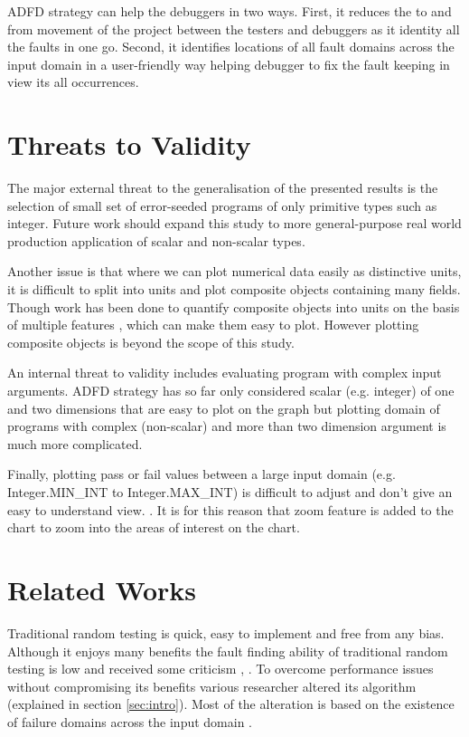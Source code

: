 \documentclass[runningheads,a4paper]{llncs}
\begin{document}
ADFD strategy can help the debuggers in two ways. First, it reduces the to and from movement of the project between the testers and debuggers as it identity all the faults in one go. Second, it identifies locations of all fault domains across the input domain in a user-friendly way helping debugger to fix the fault keeping in view its all occurrences.


\section{Threats to Validity} \label{sec:validity}
The major external threat to the generalisation of the presented results is the selection of small set of error-seeded programs of only primitive types such as integer. Future work should expand this study to more general-purpose real world production application of scalar and non-scalar types.

Another issue is that where we can plot numerical data easily as distinctive units, it is difficult to split into units and plot composite objects containing many fields. Though work has been done to quantify composite objects into units on the basis of multiple features \cite{Ciupa2006}, which can make them easy to plot. However plotting composite objects is beyond the scope of this study.

An internal threat to validity includes evaluating program with complex input arguments. ADFD strategy has so far only considered scalar (e.g. integer) of one and two dimensions that are easy to plot on the graph but plotting domain of programs with complex (non-scalar) and more than two dimension argument is much more complicated.

Finally, plotting pass or fail values between a large input domain (e.g. Integer.MIN\_INT to Integer.MAX\_INT) is difficult to adjust and don't give an easy to understand view. . It is for this reason that zoom feature is added to the chart to zoom into the areas of interest on the chart. 



\section{Related Works} \label{sec:relatedWork}
Traditional random testing is quick, easy to implement and free from any bias. Although it enjoys many benefits the fault finding ability of traditional random testing is low and received some criticism \cite{Myers2011},  \cite{Offutt1996}. To overcome performance issues without compromising its benefits various researcher altered its algorithm (explained in section \ref{sec:intro}). Most of the alteration is based on the existence of failure domains across the input domain \cite{Chan1996}. 
\end{document}
